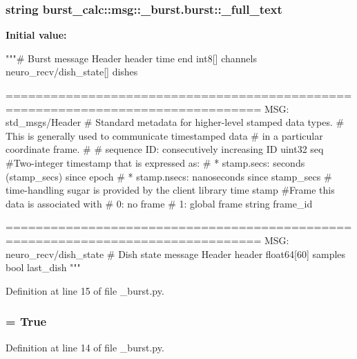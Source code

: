 \subsubsection[{\-\_\-full\-\_\-text}]{\setlength{\rightskip}{0pt plus 5cm}string {\bf burst\-\_\-calc\-::msg\-::\-\_\-burst.\-burst\-::\-\_\-full\-\_\-text}\hspace{0.3cm}{\ttfamily  [static, private]}}\label{classburst__calc_1_1msg_1_1__burst_1_1burst_a6b9da9bc64a4439851318cd4dc35cb17}
{\bfseries \-Initial value\-:}
\begin{DoxyCode}
"""# Burst message
Header header
time end
int8[] channels
neuro_recv/dish_state[] dishes

      ================================================================================
MSG: std_msgs/Header
# Standard metadata for higher-level stamped data types.
# This is generally used to communicate timestamped data 
# in a particular coordinate frame.
# 
# sequence ID: consecutively increasing ID 
uint32 seq
#Two-integer timestamp that is expressed as:
# * stamp.secs: seconds (stamp_secs) since epoch
# * stamp.nsecs: nanoseconds since stamp_secs
# time-handling sugar is provided by the client library
time stamp
#Frame this data is associated with
# 0: no frame
# 1: global frame
string frame_id


      ================================================================================
MSG: neuro_recv/dish_state
# Dish state message
Header header
float64[60] samples
bool last_dish
"""
\end{DoxyCode}


\-Definition at line 15 of file \-\_\-burst.\-py.

\subsubsection[{\-\_\-has\-\_\-header}]{ = \-True\hspace{0.3cm}{\ttfamily  [static, private]}}\label{classburst__calc_1_1msg_1_1__burst_1_1burst_a455d47aaeff4c12e640c8a3f60ba7e9c}


\-Definition at line 14 of file \-\_\-burst.\-py.

